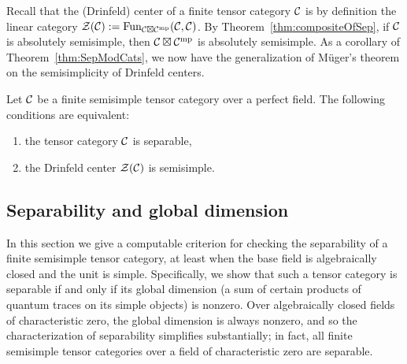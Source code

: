 \documentclass{amsart}
\begin{document}
Recall that the (Drinfeld) center of a finite tensor category $\mathcal C$ is by definition the linear category $\mathcal Z(\mathcal C) := \operatorname{Fun}_{\mathcal C \boxtimes \mathcal C^{\mathrm{mp}}}(\mathcal C,\mathcal C)$.  By Theorem~\ref{thm:compositeOfSep}, if $\mathcal C$ is absolutely semisimple, then $\mathcal C \boxtimes \mathcal C^{\mathrm{mp}}$ is absolutely semisimple.  As a corollary of Theorem~\ref{thm:SepModCats}, we now have the generalization of M\"uger's theorem on the semisimplicity of Drinfeld centers.
\begin{corollary} \label{cor:Sep=semisimplecenter}
Let $\mathcal C$ be a finite semisimple tensor category over a perfect field.  The following conditions are equivalent:
\begin{enumerate}
\item the tensor category $\mathcal C$ is separable,
\item the Drinfeld center $\mathcal Z(\mathcal C)$ is semisimple.
\end{enumerate}
\end{corollary}


\subsection{Separability and global dimension} \label{sec:tc-fusion}


In this section we give a computable criterion for checking the separability of a finite semisimple tensor category, at least when the base field is algebraically closed and the unit is simple.  Specifically, we show that such a tensor category is separable if and only if its global dimension (a sum of certain products of quantum traces on its simple objects) is nonzero.  Over algebraically closed fields of characteristic zero, the global dimension is always nonzero, and so the characterization of separability simplifies substantially; in fact, all finite semisimple tensor categories over a field of characteristic zero are separable.
\end{document}
